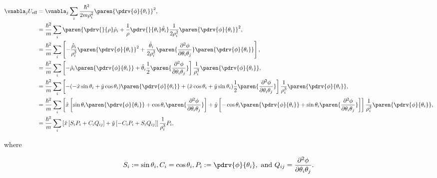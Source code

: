 \documentclass[onecolumn,amsmath,amssymb,nofootinbib,floatfix]{revtex4}
\begin{document}
$$
\begin{aligned}
\vnabla_j U_{\text{eff}}
&= \vnabla_j \sum_i \frac{\hbar^2}{2m\rho_i^2}\paren{\pdrv{\phi}{\theta_i}}^2, \\
&= \frac{\hbar^2}{m} \sum_i \paren{\pdrv{}{\rho}\hat\rho_i + \frac{1}{\rho}\pdrv{}{\theta_i}\hat\theta_i} \frac{1}{2\rho_i^2} \paren{\pdrv{\phi}{\theta_i}}^2, \\
&= \frac{\hbar^2}{m} \sum_i \left[-\frac{\hat\rho_i}{\rho_i^3} \paren{\pdrv{\phi}{\theta_i}}^2 + \frac{\hat\theta_i}{2\rho_i^3} \paren{\frac{\partial^2\phi}{\partial \theta_i \theta_j}}\paren{\pdrv{\phi}{\theta_i}}\right], \\
&= \frac{\hbar^2}{m} \sum_i \left[-\hat\rho_i \paren{\pdrv{\phi}{\theta_i}} + \hat\theta_i\frac{1}{2} \paren{\frac{\partial^2\phi}{\partial \theta_i \theta_j}}\right]\frac{1}{\rho_i^3}\paren{\pdrv{\phi}{\theta_i}}, \\
&= \frac{\hbar^2}{m} \sum_i \left[-(-\hat x\sin\theta_i + \hat y\cos\theta_i)\paren{\pdrv{\phi}{\theta_i}} + (\hat x\cos\theta_i + \hat y\sin\theta_i)\frac{1}{2} \paren{\frac{\partial^2\phi}{\partial \theta_i \theta_j}}\right]\frac{1}{\rho_i^3}\paren{\pdrv{\phi}{\theta_i}}, \\
&= \frac{\hbar^2}{m} \sum_i \left[
\hat x \left[\sin\theta_i\paren{\pdrv{\phi}{\theta_i}} + \cos\theta_i\paren{\frac{\partial^2\phi}{\partial \theta_i \theta_j}}\right] +
\hat y \left[-\cos\theta_i\paren{\pdrv{\phi}{\theta_i}} + \sin\theta_i\paren{\frac{\partial^2\phi}{\partial \theta_i \theta_j}}\right]
 \right]\frac{1}{\rho_i^3}\paren{\pdrv{\phi}{\theta_i}}, \\
&= \frac{\hbar^2}{m} \sum_i \left[
\hat x \left[S_i P_i + C_i Q_{ij}\right] +
\hat y \left[-C_i P_i + S_i Q_{ij}\right]
 \right]\frac{1}{\rho_i^3}P_i, \\
\end{aligned}
$$

where

$$S_i := \sin\theta_i, C_i = \cos\theta_i, P_i := \pdrv{\phi}{\theta_i},\,\,\text{and}\,\,Q_{ij} = \frac{\partial^2\phi}{\partial \theta_i \theta_j}.$$
\end{document}
